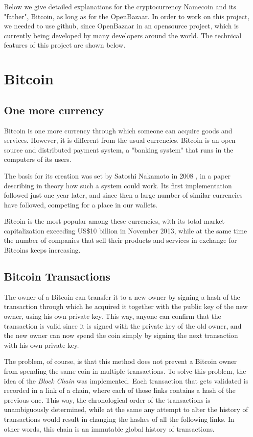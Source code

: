 \documentclass[journal]{IEEEtran}
\begin{document}
Below we give detailed explanations for the cryptocurrency Namecoin and its "father", Bitcoin, as long as for the OpenBazaar. In order to work on this project, we needed to use github, since OpenBazaar in an opensource project, which is currently being developed by many developers around the world. The technical features of this project are shown below.  

\section{Bitcoin}

\subsection{One more currency}

Bitcoin is one more currency through which someone can acquire goods and services. However, it is
different from the usual currencies. Bitcoin is an open-source and distributed payment system,
a "banking system" that runs in the computers of its users.

The basis for its creation was set by Satoshi Nakamoto in 2008 \cite{Satoshi}, in a paper describing
in theory how such a system could work. Its first implementation followed just one year later,
and since then a large number of similar currencies have followed, competing for a place in our
wallets. 

Bitcoin is the most popular among these currencies, with its total market capitalization
exceeding US\$10 billion in November 2013, while at the same time the number of companies that
sell their products and services in exchange for Bitcoins keeps increasing.

\subsection{Bitcoin Transactions}

The owner of a Bitcoin can transfer it to a new owner by signing a hash of the transaction
through which he acquired it together with the public key of the new owner, using his own private
key. This way, anyone can confirm that the transaction is valid since it is signed with the 
private key of the old owner, and the new owner can now spend the coin simply by signing
the next transaction with his own private key.

The problem, of course, is that this method does not prevent a Bitcoin owner from spending
the same coin in multiple transactions. To solve this problem, the idea of the \textit{Block
Chain} was implemented. Each transaction that gets validated is recorded in a link of a chain,
where each of those links contains a hash of the previous one. This way, the chronological order
of the transactions is unambiguously determined, while at the same any attempt to alter the
history of transactions would result in changing the hashes of all the following links.
In other words, this chain is an immutable global history of transactions.
\end{document}
